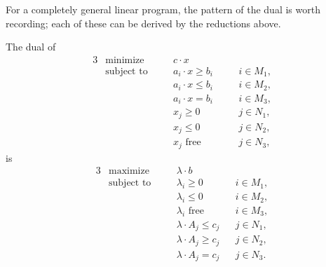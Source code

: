 For a completely general linear program, the pattern of the dual is worth recording; each of these can be derived by the reductions above.

\begin{proposition}
    The dual of
    \begin{alignat*}{3}
        & \text{minimize} \quad && c\cdot x && \\
        & \text{subject to} \quad && a_i \cdot x \geq b_i \quad&& i \in M_1,\\
        & && a_i \cdot x \leq b_i && i \in M_2,\\
        & && a_i \cdot x = b_i && i \in M_3,\\
        & && x_j \geq 0 && j \in N_1,\\
        & && x_j \leq 0 && j \in N_2,\\
        & && x_j \text{ free} && j \in N_3,
    \end{alignat*}
    is
    \begin{alignat*}{3}
        & \text{maximize} \quad && \lambda \cdot b && \\
        & \text{subject to} \quad && \lambda_i \geq 0 \quad&& i \in M_1,\\
        & && \lambda_i \leq 0 && i \in M_2,\\
        & && \lambda_i \text{ free} && i \in M_3,\\
        & && \lambda\cdot A_j \leq c_j && j \in N_1,\\
        & && \lambda \cdot A_j \geq c_j && j \in N_2,\\
        & && \lambda\cdot A_j = c_j && j \in N_3.
    \end{alignat*}
\end{proposition}

